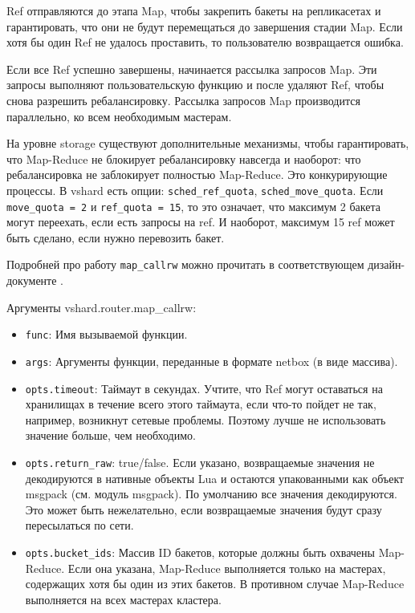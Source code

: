 Ref отправляются до этапа Map, чтобы закрепить бакеты на репликасетах и
гарантировать, что они не будут перемещаться до завершения стадии Map. Если
хотя бы один Ref не удалось проставить, то пользователю возвращается ошибка.

Если все Ref успешно завершены, начинается рассылка запросов Map. Эти запросы
выполняют пользовательскую функцию и после удаляют Ref, чтобы снова разрешить
ребалансировку. Рассылка запросов Map производится параллельно, ко всем
необходимым мастерам.

На уровне storage существуют дополнительные механизмы, чтобы гарантировать,
что Map-Reduce не блокирует ребалансировку навсегда и наоборот: что
ребалансировка не заблокирует полностью Map-Reduce. Это конкурирующие процессы.
В vshard есть опции: \texttt{sched\_ref\_quota}, \texttt{sched\_move\_quota}.
Если \texttt{move\_quota = 2} и \texttt{ref\_quota = 15}, то это означает, что
максимум 2 бакета могут переехать, если есть запросы на ref. И наоборот,
максимум 15 ref может быть сделано, если нужно перевозить бакет.

Подробней про работу \texttt{map\_callrw} можно прочитать в соответствующем
дизайн-документе \cite{MapCallrwRfc}.

Аргументы vshard.router.map\_callrw:

\begin{itemize}
\item \texttt{func}: Имя вызываемой функции.
\item \texttt{args}: Аргументы функции, переданные в формате netbox (в виде
    массива).
\item \texttt{opts.timeout}: Таймаут в секундах. Учтите, что Ref могут
    оставаться на хранилищах в течение всего этого таймаута, если что-то пойдет
        не так, например, возникнут сетевые проблемы. Поэтому лучше не
        использовать значение больше, чем необходимо.
\item \texttt{opts.return\_raw}: true/false. Если указано, возвращаемые
    значения не декодируются в нативные объекты Lua и остаются упакованными как
        объект msgpack (см. модуль msgpack). По умолчанию все значения
        декодируются. Это может быть нежелательно, если возвращаемые значения
        будут сразу пересылаться по сети.
\item \texttt{opts.bucket\_ids}: Массив ID бакетов, которые должны быть
    охвачены Map-Reduce. Если она указана, Map-Reduce выполняется только на
        мастерах, содержащих хотя бы один из этих бакетов. В противном случае
        Map-Reduce выполняется на всех мастерах кластера.
\end{itemize}

